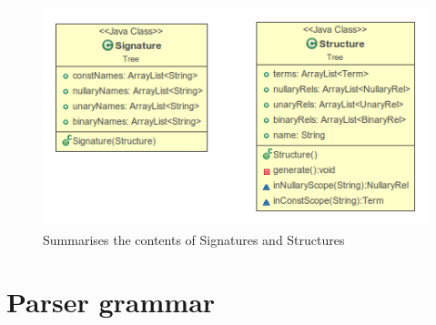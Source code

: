\documentclass{report}
\begin{document}
\begin{figure}[h!]
\centering \includegraphics[width=\textwidth]{SnS.png}
\caption{Summarises the contents of Signatures and Structures}
\end{figure}
\newpage

\chapter{Parser grammar}


\end{document}
